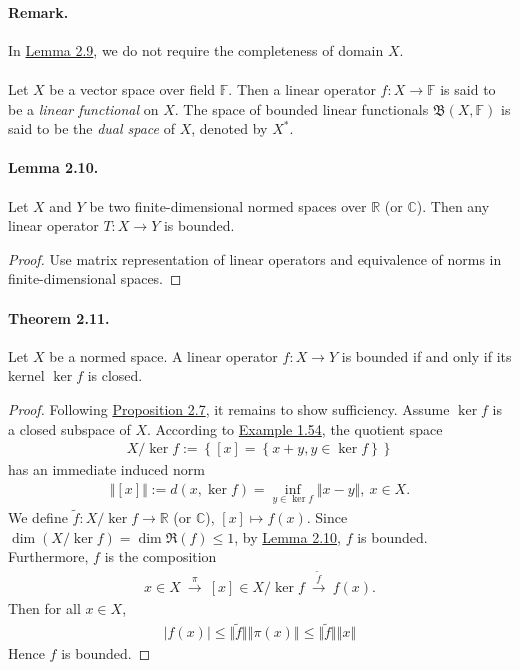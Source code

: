 \documentclass{article}
\begin{document}
\paragraph{Remark.} In \hyperref[lemma:2.9]{Lemma 2.9}, we do not require the completeness of domain $X$.

\paragraph{} Let $X$ be a vector space over field $\mathbb{F}$. Then a linear operator $f:X\to\mathbb{F}$ is said to be a \textit{linear functional} on $X$. The space of bounded linear functionals $\mathfrak{B}(X,\mathbb{F})$ is said to be the \textit{dual space} of $X$, denoted by $X^*$.

\paragraph{Lemma 2.10.\label{lemma:2.10}} Let $X$ and $Y$ be two finite-dimensional normed spaces over $\mathbb{R}$ (or $\mathbb{C}$). Then any linear operator $T:X\to Y$ is bounded.
\begin{proof}
Use matrix representation of linear operators and equivalence of norms in finite-dimensional spaces.
\end{proof}
\paragraph{Theorem 2.11.\label{thm:2.11}} Let $X$ be a normed space. A linear operator $f:X\to Y$ is bounded if and only if its kernel $\ker f$ is closed.
\begin{proof}
Following \hyperref[prop:2.7]{Proposition 2.7}, it remains to show sufficiency. Assume $\ker f$ is a closed subspace of $X$. According to \hyperref[example:1.54]{Example 1.54}, the quotient space
\begin{align*}
	X/\ker f:= \left\{[x]=\left\{x+y,y\in\ker f\right\}\right\}
\end{align*}
has an immediate induced norm
\begin{align*}
	\Vert [x]\Vert := d(x,\ker f) = \inf_{y\in\ker f}\Vert x-y\Vert,\ x\in X.
\end{align*}
We define $\tilde{f}:X/\ker f\to \mathbb{R}$ (or $\mathbb{C}$), $[x]\mapsto f(x)$. Since $\dim(X/\ker f)=\dim\mathfrak{R}(f)\leq 1$,  by \hyperref[lemma:2.10]{Lemma 2.10}, $f$ is bounded. Furthermore, $f$ is the composition
\begin{align*}
	x\in X\ \overset{\pi}{\to}\ [x]\in X/\ker f\ \overset{\tilde{f}}{\to}\ f(x).
\end{align*}
Then for all $x\in X$,
\begin{align*}
	\vert f(x)\vert \leq \bigl\Vert\tilde{f}\bigr\Vert\left\Vert \pi(x)\right\Vert \leq \bigl\Vert\tilde{f}\bigr\Vert\left\Vert x\right\Vert
\end{align*}
Hence $f$ is bounded.
\end{proof}
\end{document}
